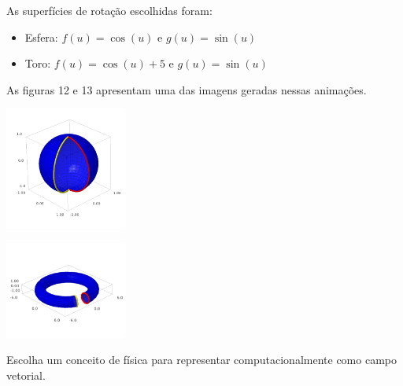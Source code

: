 \documentclass[../main.tex]{subfiles}
\begin{document}
		\begin{solucao}
			As superfícies de rotação escolhidas foram:
			\begin{itemize}
				\item Esfera: $f(u)=\cos(u)$ e $g(u)=\sin(u)$
				\item Toro: $f(u)=\cos(u)+5$ e $g(u)=\sin(u)$
			\end{itemize}
			
			As figuras 12 e 13 apresentam uma das imagens geradas nessas animações.
			
			\begin{center}
				\includegraphics[width=0.3\textwidth]{imagens/lista03/picture_lista03_q03_item01.png}
			\end{center}
			
			\begin{center}
				\includegraphics[width=0.3\textwidth]{imagens/lista03/picture_lista03_q03_item02.png}
			\end{center}
			
			\vspace{\baselineskip}
		\end{solucao}
		
		\begin{exercicio}{4}
			Escolha um conceito de física para representar computacionalmente como campo vetorial.
		\end{exercicio}
		
\end{document}
